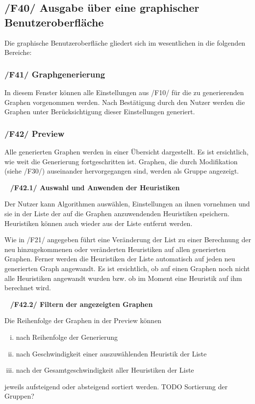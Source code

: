\documentclass{article}
\begin{document}
	\subsection*{/F40/ Ausgabe über eine graphischer Benutzeroberfläche} \label{f40} 
	Die graphische Benutzeroberfläche gliedert sich im wesentlichen in die folgenden Bereiche:
	
	\subsubsection*{/F41/ Graphgenerierung} \label{f51} 
	In diesem Fenster können alle Einstellungen aus /F10/ für die zu generierenden Graphen vorgenommen werden. Nach Bestätigung durch den Nutzer werden die Graphen unter Berücksichtigung dieser Einstellungen generiert.
	
	\subsubsection*{/F42/ Preview} \label{f42} 
	Alle generierten Graphen werden in einer Übersicht dargestellt. Es ist ersichtlich, wie weit die Generierung fortgeschritten ist. Graphen, die durch Modifikation (siehe /F30/) auseinander hervorgegangen sind, werden als Gruppe angezeigt.
	
	~\newline
	\textbf{/F42.1/ Auswahl und Anwenden der Heuristiken}
	
	Der Nutzer kann Algorithmen auswählen, Einstellungen an ihnen vornehmen und sie in der Liste der auf die Graphen anzuwendenden Heuristiken speichern. Heuristiken können auch wieder aus der Liste entfernt werden. 
	
	Wie in /F21/ angegeben führt eine Veränderung der List zu einer Berechnung der neu hinzugekommenen oder veränderten Heuristiken auf allen generierten Graphen. Ferner werden die Heuristiken der Liste automatisch auf jeden neu generierten Graph angewandt.
	Es ist ersichtlich, ob auf einen Graphen noch nicht alle Heuristiken angewandt wurden bzw. ob im Moment eine Heuristik auf ihm berechnet wird.
	
	~\newline
	\textbf{/F42.2/ Filtern der angezeigten Graphen}
	
	Die Reihenfolge der Graphen in der Preview können
	\begin{enumerate}[i)]
		\item{nach Reihenfolge der Generierung}
		\item{nach Geschwindigkeit einer auszuwählenden Heuristik der Liste}
		\item{nach der Gesamtgeschwindigkeit aller Heuristiken der Liste}
	\end{enumerate}
	jeweils aufsteigend oder absteigend sortiert werden.
	TODO Sortierung der Gruppen?
	
\end{document}
